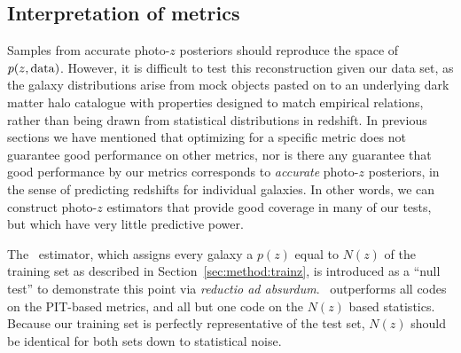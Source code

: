



\subsection{Interpretation of metrics}\label{sec:caution}

Samples from accurate photo-$z$ posteriors should reproduce the space of $p(z,{\rm data})$. However, it is difficult to test this reconstruction given our data set, as the galaxy distributions arise from mock objects pasted on to an underlying dark matter halo catalogue with properties designed to match empirical relations, rather than being drawn from statistical distributions in redshift.  In previous sections we have mentioned that optimizing for a specific metric does not guarantee good performance on other metrics, nor is there any guarantee that good performance by our metrics corresponds to \textit{accurate} photo-$z$ posteriors, in the sense of predicting redshifts for individual galaxies.
In other words, we can construct photo-$z$ estimators that provide good coverage in many of our tests, but which have very little predictive power.


The \trainz\ estimator, which assigns every galaxy a $p(z)$ equal to $N(z)$ of the training set as described in Section~\ref{sec:method:trainz}, is introduced as a ``null test'' to demonstrate this point via \textit{reductio ad absurdum}.
\trainz\ outperforms all codes on the PIT-based metrics, and all but one code on the $N(z)$ based statistics.
Because our training set is perfectly representative of the test set, $N(z)$ should be identical for both sets down to statistical noise.

